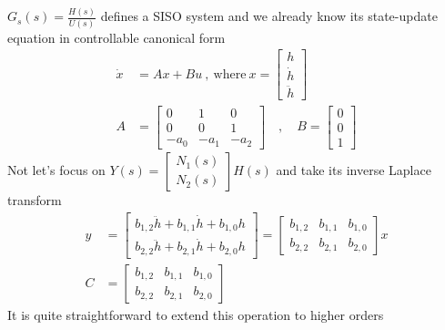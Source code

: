\documentclass[twoside]{article}
\begin{document}
%
$G_s(s) = \frac{H(s)}{U(s)} $ defines a SISO system and we already know its state-update equation in controllable canonical form
%
\begin{align*}
\dot{x} &= A x + B u \ , \ \mathrm{where} \ x = \left[ \begin{array}{c} h \\ \dot{h} \\ \ddot{h} \end{array} \right]
\\
A &= \left[ \begin{array}{ccc} 0 & 1 & 0  \\ 0 & 0 & 1 \\
 -a_0 & -a_1 & -a_2  \end{array} \right]
\quad , \quad 
B = \left[ \begin{array}{c} 0 \\ 0 \\  1 \end{array} \right]
\end{align*}
%
Not let's focus on $Y(s) = \left[ \begin{array}{c} N_1(s) \\ N_2(s) \end{array} \right] H(s) $ and take its inverse Laplace transform
%
\begin{align}
  y &= \left[ \begin{array}{c} b_{1,2} \ddot{h}  + b_{1,1} \dot{h} + b_{1,0} h
	       \\  b_{2,2} \ddot{h} + b_{2,1} \dot{h} + b_{2,0}  h \end{array} \right] = \left[ \begin{array}{ccc} b_{1,2}  & b_{1,1}  & b_{1,0} 
	       \\  b_{2,2}  &  b_{2,1} & b_{2,0}  \end{array} \right] x
	       \\
	       C &= \left[ \begin{array}{ccc} b_{1,2}  & b_{1,1}  & b_{1,0} 
	       \\  b_{2,2}  &  b_{2,1} & b_{2,0}  \end{array} \right]
\end{align}
% 
It is quite straightforward to extend this operation to higher orders
\end{document}
